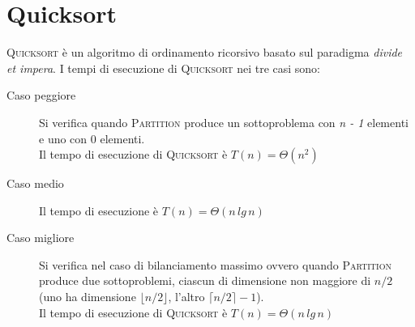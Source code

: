 \documentclass[11pt]{article}
\begin{document}
\section{Quicksort}
\textsc{Quicksort} è un algoritmo di ordinamento ricorsivo basato sul paradigma \textit{divide et impera}. I tempi di esecuzione di \textsc{Quicksort} nei tre casi sono:
\begin{description}
\item[Caso peggiore]Si verifica quando \textsc{Partition} produce un sottoproblema con \textit{n - 1} elementi e uno con 0 elementi.\\Il tempo di esecuzione di \textsc{Quicksort} è $T(n) = \Theta(n^2)$
\item[Caso medio]Il tempo di esecuzione è $T(n) = \Theta(n\,lg\,n)$
\item[Caso migliore]Si verifica nel caso di bilanciamento massimo ovvero quando \textsc{Partition} produce due sottoproblemi, ciascun di dimensione non maggiore di $n/2$ (uno ha dimensione $\lfloor n/2 \rfloor$, l'altro $\lceil n/2 \rceil - 1$).\\Il tempo di esecuzione di \textsc{Quicksort} è $T(n) = \Theta(n\,lg\,n)$
\end{description}
\end{document}
